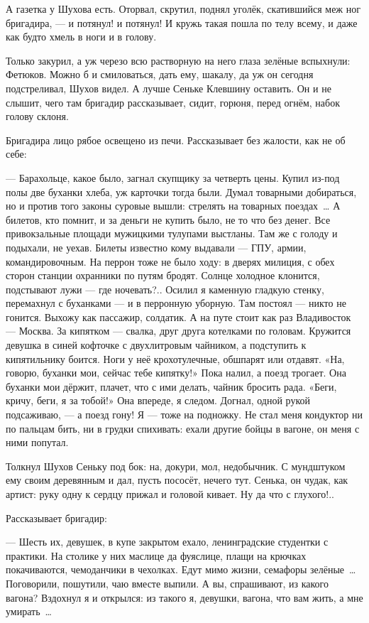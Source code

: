 А газетка у Шухова есть. Оторвал, скрутил, поднял уголёк, скатившийся меж ног бригадира, --- и 
потянул! и потянул! И кружь такая пошла по телу всему, и даже как будто хмель в ноги и в голову.

Только закурил, а уж черезо всю растворную на него глаза зелёные вспыхнули: Фетюков. Можно б 
и смиловаться, дать ему, шакалу, да уж он сегодня подстреливал, Шухов видел. А лучше Сеньке 
Клевшину оставить. Он и не слышит, чего там бригадир рассказывает, сидит, горюня, перед огнём, 
набок голову склоня.

Бригадира лицо рябое освещено из печи. Рассказывает без жалости, как не об себе:

--- Барахольце, какое было, загнал скупщику за четверть цены. Купил из-под полы две буханки 
хлеба, уж карточки тогда были. Думал товарными добираться, но и против того законы суровые 
вышли: стрелять на товарных поездах~\dots{} А билетов, кто помнит, и за деньги не купить было, не 
то что без денег. Все привокзальные площади мужицкими тулупами выстланы. Там же с голоду и 
подыхали, не уехав. Билеты известно кому выдавали --- ГПУ, армии, командировочным. На перрон 
тоже не было ходу: в дверях милиция, с обех сторон станции охранники по путям бродят. Солнце 
холодное клонится, подстывают лужи --- где ночевать?.. Осилил я каменную гладкую стенку, 
перемахнул с буханками --- и в перронную уборную. Там постоял --- никто не гонится. Выхожу как 
пассажир, солдатик. А на путе стоит как раз Владивосток --- Москва. За кипятком --- свалка, друг 
друга котелками по головам. Кружится девушка в синей кофточке с двухлитровым чайником, а 
подступить к кипятильнику боится. Ноги у неё крохотулечные, обшпарят или отдавят. «На, 
говорю, буханки мои, сейчас тебе кипятку!» Пока налил, а поезд трогает. Она буханки мои 
дёржит, плачет, что с ими делать, чайник бросить рада. «Беги, кричу, беги, я за тобой!» Она 
впереде, я следом. Догнал, одной рукой подсаживаю, --- а поезд гону! Я --- тоже на подножку. Не 
стал меня кондуктор ни по пальцам бить, ни в грудки спихивать: ехали другие бойцы в вагоне, он 
меня с ними попутал.

Толкнул Шухов Сеньку под бок: на, докури, мол, недобычник. С мундштуком ему своим деревянным и 
дал, пусть пососёт, нечего тут. Сенька, он чудак, как артист: руку одну к сердцу прижал и 
головой кивает. Ну да что с глухого!..

Рассказывает бригадир:

--- Шесть их, девушек, в купе закрытом ехало, ленинградские студентки с практики. На столике у 
них маслице да фуяслице, плащи на крючках покачиваются, чемоданчики в чехолках. Едут мимо 
жизни, семафоры зелёные~\dots{} Поговорили, пошутили, чаю вместе выпили. А вы, спрашивают, из 
какого вагона? Вздохнул я и открылся: из такого я, девушки, вагона, что вам жить, а мне 
умирать~\dots{}

